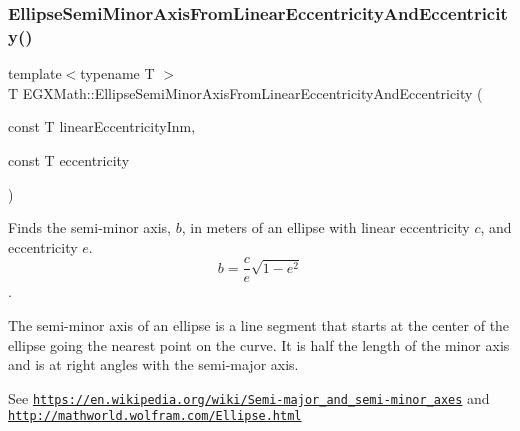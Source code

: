\mbox{\label{group___e_g_x_math-_geometry-2_d-_ellipse-_semi_minor_axis_ga7d19bfb56b8d9678c8ff7c843e1ae3b6}} 
\subsubsection{\texorpdfstring{Ellipse\+Semi\+Minor\+Axis\+From\+Linear\+Eccentricity\+And\+Eccentricity()}{EllipseSemiMinorAxisFromLinearEccentricityAndEccentricity()}}
{\footnotesize\ttfamily template$<$typename T $>$ \\
T E\+G\+X\+Math\+::\+Ellipse\+Semi\+Minor\+Axis\+From\+Linear\+Eccentricity\+And\+Eccentricity (\begin{DoxyParamCaption}\item[{const T}]{linear\+Eccentricity\+Inm,  }\item[{const T}]{eccentricity }\end{DoxyParamCaption})}



Finds the semi-\/minor axis, $b$, in meters of an ellipse with linear eccentricity $c$, and eccentricity $e$. \[ b=\dfrac{c}{e}\sqrt{1 - e^2}\]. 

The semi-\/minor axis of an ellipse is a line segment that starts at the center of the ellipse going the nearest point on the curve. It is half the length of the minor axis and is at right angles with the semi-\/major axis.

See \href{https://en.wikipedia.org/wiki/Semi-major_and_semi-minor_axes}{\tt https\+://en.\+wikipedia.\+org/wiki/\+Semi-\/major\+\_\+and\+\_\+semi-\/minor\+\_\+axes} and \href{http://mathworld.wolfram.com/Ellipse.html}{\tt http\+://mathworld.\+wolfram.\+com/\+Ellipse.\+html}


